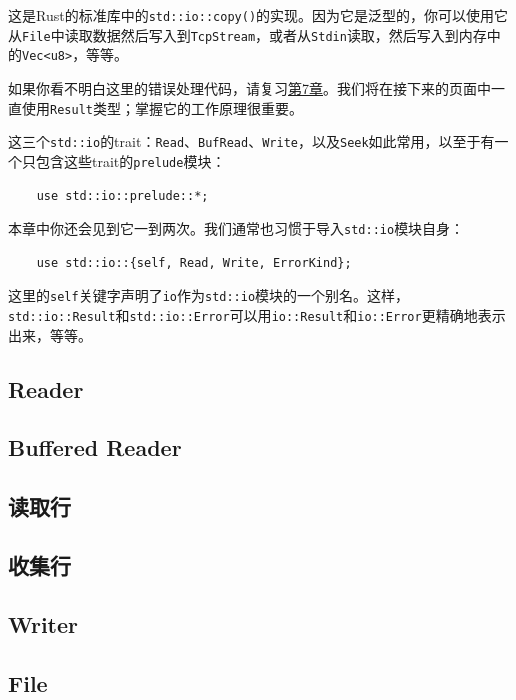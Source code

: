 这是Rust的标准库中的\texttt{std::io::copy()}的实现。因为它是泛型的，你可以使用它从\texttt{File}中读取数据然后写入到\texttt{TcpStream}，或者从\texttt{Stdin}读取，然后写入到内存中的\texttt{Vec<u8>}，等等。

如果你看不明白这里的错误处理代码，请复习\hyperref[ch07]{第7章}。我们将在接下来的页面中一直使用\texttt{Result}类型；掌握它的工作原理很重要。

这三个\texttt{std::io}的trait：\texttt{Read}、\texttt{BufRead}、\texttt{Write}，以及\texttt{Seek}如此常用，以至于有一个只包含这些trait的\texttt{prelude}模块：
\begin{verbatim}
    use std::io::prelude::*;
\end{verbatim}

本章中你还会见到它一到两次。我们通常也习惯于导入\texttt{std::io}模块自身：
\begin{verbatim}
    use std::io::{self, Read, Write, ErrorKind};
\end{verbatim}

这里的\texttt{self}关键字声明了\texttt{io}作为\texttt{std::io}模块的一个别名。这样，\texttt{std::io::Result}和\texttt{std::io::Error}可以用\texttt{io::Result}和\texttt{io::Error}更精确地表示出来，等等。

\subsection{Reader}


\subsection{Buffered Reader}

\subsection{读取行}

\subsection{收集行}

\subsection{Writer}

\subsection{File}\label{file}